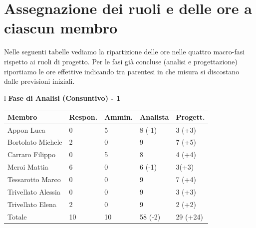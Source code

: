 \documentclass[11pt,titlepage,a4paper]{report}
\begin{document}
\section{Assegnazione dei ruoli e delle ore a ciascun membro}
Nelle seguenti tabelle vediamo la ripartizione delle ore nelle quattro macro-fasi rispetto ai ruoli di progetto. Per le fasi gi\`a concluse (analisi e progettazione) riportiamo le ore effettive indicando tra parentesi in che misura si discostano dalle previsioni iniziali.
\begin{table}[hbtp]
\large{
\begin{tabular}{l}
\Large{\textbf{\textsf{Fase di Analisi (Consuntivo) - 1}}} \\
\begin{tabular}{||p{3.5cm}||p{2cm}||p{2cm}||p{2cm}||p{2cm}||}
\hline
\textbf{Membro} & \textbf{Respon.} & \textbf{Ammin.} & \textbf{Analista}

& \textbf{Progett.}\\
\hline
{Appon Luca}&0&5&8 \footnotesize{(-1)}&3 \footnotesize{(+3)} \\ 
\hline 
{Bortolato Michele} &2&0&9&7 \footnotesize{(+5)}\\ 
\hline
{Carraro Filippo}&0&5&8&4 \footnotesize{(+4)} \\
\hline
{Meroi Mattia}&6&0&6 \footnotesize{(-1)}&3\footnotesize{(+3)}\\
\hline
{Tessarotto Marco} &0&0&9&7 \footnotesize{(+4)}\\
\hline
{Trivellato Alessia} &0&0&9&3 \footnotesize{(+3)} \\
\hline
{Trivellato Elena} &2&0&9&2 \footnotesize{(+2)} \\
\hline
{Totale}& 10&10&58 \footnotesize{(-2)}&29 \footnotesize{(+24)} \\
\hline

\end{tabular} \\
\end{tabular}
}
\end{table}
\end{document}
